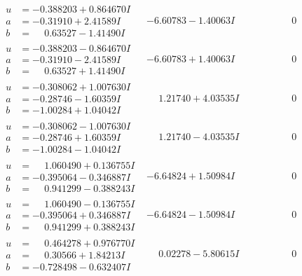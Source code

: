 \documentclass[1p]{elsarticle_modified}
\theoremstyle{definition}
\begin{document}
$$\begin{array}{c|c|c}
\begin{aligned}
u &= -0.388203 + 0.864670 I \\
a &= -0.31910 + 2.41589 I \\
b &= \phantom{-}0.63527 - 1.41490 I\end{aligned}
 & -6.60783 - 1.40063 I & \phantom{-0.000000 } 0 \\ \hline\begin{aligned}
u &= -0.388203 - 0.864670 I \\
a &= -0.31910 - 2.41589 I \\
b &= \phantom{-}0.63527 + 1.41490 I\end{aligned}
 & -6.60783 + 1.40063 I & \phantom{-0.000000 } 0 \\ \hline\begin{aligned}
u &= -0.308062 + 1.007630 I \\
a &= -0.28746 - 1.60359 I \\
b &= -1.00284 + 1.04042 I\end{aligned}
 & \phantom{-}1.21740 + 4.03535 I & \phantom{-0.000000 } 0 \\ \hline\begin{aligned}
u &= -0.308062 - 1.007630 I \\
a &= -0.28746 + 1.60359 I \\
b &= -1.00284 - 1.04042 I\end{aligned}
 & \phantom{-}1.21740 - 4.03535 I & \phantom{-0.000000 } 0 \\ \hline\begin{aligned}
u &= \phantom{-}1.060490 + 0.136755 I \\
a &= -0.395064 - 0.346887 I \\
b &= \phantom{-}0.941299 - 0.388243 I\end{aligned}
 & -6.64824 + 1.50984 I & \phantom{-0.000000 } 0 \\ \hline\begin{aligned}
u &= \phantom{-}1.060490 - 0.136755 I \\
a &= -0.395064 + 0.346887 I \\
b &= \phantom{-}0.941299 + 0.388243 I\end{aligned}
 & -6.64824 - 1.50984 I & \phantom{-0.000000 } 0 \\ \hline\begin{aligned}
u &= \phantom{-}0.464278 + 0.976770 I \\
a &= \phantom{-}0.30566 + 1.84213 I \\
b &= -0.728498 - 0.632407 I\end{aligned}
 & \phantom{-}0.02278 - 5.80615 I & \phantom{-0.000000 } 0 \\ \hline\begin{aligned}

\end{aligned}
\end{array}$$
\end{document}
